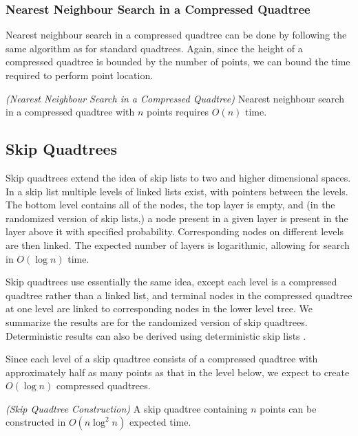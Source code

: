 \documentclass[mcs]{scsthesis}
\begin{document}
\subsubsection{Nearest Neighbour Search in a Compressed Quadtree}

Nearest neighbour search in a compressed quadtree can be done by following the
same algorithm as for standard quadtrees. Again, since the height of a compressed
quadtree is bounded by the number of points, we can bound the time required to
perform point location.

\begin{thm} \emph{(Nearest Neighbour Search in a Compressed Quadtree)} 
Nearest neighbour search in a compressed quadtree with $n$ points requires
\(O(n)\) time.
\end{thm}

\subsection{Skip Quadtrees}

Skip quadtrees extend the idea of skip lists \cite{skiplist} to two and higher
dimensional spaces. In a skip list multiple levels of linked lists exist, with
pointers between the levels. The bottom level contains all of the nodes, the
top layer is empty, and (in the randomized version of skip lists,) a node
present in a given layer is present in the layer above it with specified
probability. Corresponding nodes on different levels are then linked. The
expected number of layers is logarithmic, allowing for search in \(O(\log n)\)
time.

Skip quadtrees use essentially the same idea, except each level is a
compressed quadtree rather than a linked list, and terminal nodes in the
compressed quadtree at one level are linked to corresponding nodes in the
lower level tree. We summarize the results are for the randomized version of
skip quadtrees. Deterministic results can also be derived using deterministic
skip lists \cite{skipquadtree}.

Since each level of a skip quadtree consists of a compressed quadtree with
approximately half as many points as that in the level below, we expect to
create \(O(\log n)\) compressed quadtrees.

\begin{thm} \emph{(Skip Quadtree Construction)}
A skip quadtree containing $n$ points can be constructed in \(O(n \log^2 n)\)
expected time.
\end{thm}
\end{document}
